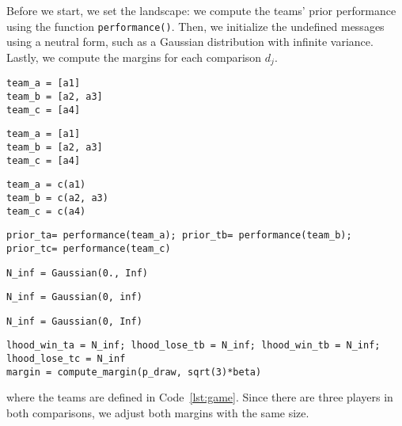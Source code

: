 \documentclass[article]{jss}
\begin{document}
%
% 
Before we start, we set the landscape: we compute the teams' prior performance using the function \texttt{performance()}. 
Then, we initialize the undefined messages using a neutral form, such as a Gaussian distribution with infinite variance. 
Lastly, we compute the margins for each comparison $d_j$.
%
\begin{paracol}{3}
\begin{lstlisting}[backgroundcolor=\color{julia!60}, belowskip=0cm]
team_a = [a1]
team_b = [a2, a3]
team_c = [a4]
\end{lstlisting}
  \switchcolumn
\begin{lstlisting}[backgroundcolor=\color{python!60}, belowskip=0cm]
team_a = [a1]
team_b = [a2, a3]
team_c = [a4]
\end{lstlisting}
   \switchcolumn
\begin{lstlisting}[backgroundcolor=\color{r!50}, belowskip=0cm]
team_a = c(a1)
team_b = c(a2, a3)
team_c = c(a4)
\end{lstlisting}  
\end{paracol}
\begin{lstlisting}[backgroundcolor=\color{all},aboveskip=0cm,belowskip=0cm]
prior_ta= performance(team_a); prior_tb= performance(team_b); prior_tc= performance(team_c)
\end{lstlisting}
\begin{paracol}{3}
\begin{lstlisting}[backgroundcolor=\color{julia!60},aboveskip=0cm,belowskip=0cm]
N_inf = Gaussian(0., Inf)
\end{lstlisting}
\switchcolumn
\begin{lstlisting}[backgroundcolor=\color{python!60}, aboveskip=0cm,belowskip=0cm]
N_inf = Gaussian(0, inf)
\end{lstlisting}
\switchcolumn
\begin{lstlisting}[backgroundcolor=\color{r!50}, aboveskip=0cm,belowskip=0cm]
N_inf = Gaussian(0, Inf)
\end{lstlisting}
\end{paracol}
\begin{lstlisting}[captionpos=b,backgroundcolor=\color{all},label=lst:graphical_model, caption={Setting the landscape.}, aboveskip=0cm, belowskip=0cm]
lhood_win_ta = N_inf; lhood_lose_tb = N_inf; lhood_win_tb = N_inf; lhood_lose_tc = N_inf
margin = compute_margin(p_draw, sqrt(3)*beta)
\end{lstlisting}
where the teams are defined in Code~\ref{lst:game}. 
Since there are three players in both comparisons, we adjust both margins with the same size. 
\end{document}
